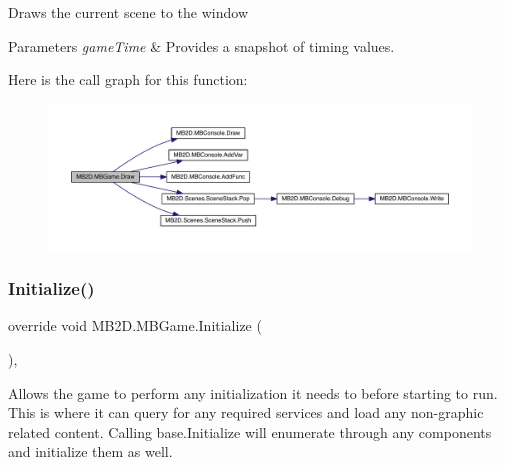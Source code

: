 Draws the current scene to the window 


\begin{DoxyParams}{Parameters}
{\em game\+Time} & Provides a snapshot of timing values.\\
\hline
\end{DoxyParams}
Here is the call graph for this function\+:\nopagebreak
\begin{figure}[H]
\begin{center}
\leavevmode
\includegraphics[width=350pt]{class_m_b2_d_1_1_m_b_game_ad791072c4d2a5b23bbaec3542d6facc9_cgraph}
\end{center}
\end{figure}
\hypertarget{class_m_b2_d_1_1_m_b_game_a2157be479c1831c49301cd472cc01cde}{}\label{class_m_b2_d_1_1_m_b_game_a2157be479c1831c49301cd472cc01cde} 
\subsubsection{\texorpdfstring{Initialize()}{Initialize()}}
{\footnotesize\ttfamily override void M\+B2\+D.\+M\+B\+Game.\+Initialize (\begin{DoxyParamCaption}{ }\end{DoxyParamCaption})\hspace{0.3cm}{\ttfamily [inline]}, {\ttfamily [protected]}}



Allows the game to perform any initialization it needs to before starting to run. This is where it can query for any required services and load any non-\/graphic related content. Calling base.\+Initialize will enumerate through any components and initialize them as well. 

